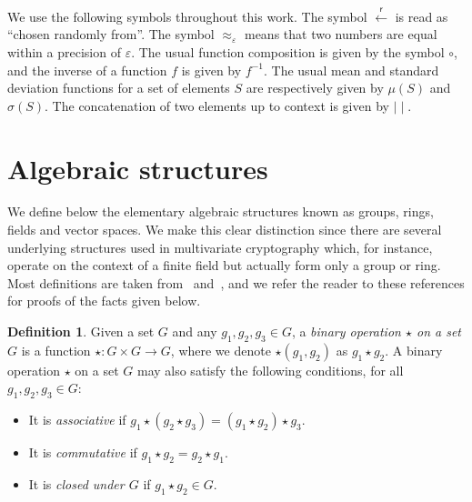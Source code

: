 \documentclass[12pt, a4paper, oneside]{memoir}
\newcommand{\random}{\overset{\mathsf{r}}{\gets}}
\theoremstyle{definition}
\newtheorem{definition}[theorem]{Definition}
\begin{document}
We use the following symbols throughout this work. The symbol $\random$ is read as ``chosen randomly from''. The symbol $\approx_{\varepsilon}$ means that two numbers are equal within a precision of $\varepsilon$. The usual function composition is given by the symbol $\circ$, and the inverse of a function $f$ is given by $f^{-1}$. The usual mean and standard deviation functions for a set of elements $S$ are respectively given by $\mu(S)$ and $\sigma(S)$. The concatenation of two elements up to context is given by $\mid\mid$.

\section{Algebraic structures}\label{sec:algebra}

We define below the elementary algebraic structures known as groups, rings, fields and vector spaces. We make this clear distinction since there are several underlying structures used in multivariate cryptography which, for instance, operate on the context of a finite field but actually form only a group or ring. Most definitions are taken from~\cite{Dummit:2003} and~\cite{Mullen:2013}, and we refer the reader to these references for proofs of the facts given below.

\begin{definition}
  Given a set $G$ and any $g_{1}, g_{2}, g_{3} \in G$, a \emph{binary operation $\star$ on a set $G$} is a function $\star : G \times G \to G$, where we denote $\star(g_{1}, g_{2})$ as $g_{1} \star g_{2}$. A binary operation $\star$ on a set $G$ may also satisfy the following conditions, for all $g_{1}, g_{2}, g_{3} \in G$:
  
  \begin{itemize}
    \item It is \emph{associative} if $g_{1} \star (g_{2} \star g_{3}) = (g_{1} \star g_{2}) \star g_{3}$.
    \item It is \emph{commutative} if $g_{1} \star g_{2} = g_{2} \star g_{1}$.
    \item It is \emph{closed under $G$} if $g_{1} \star g_{2} \in G$.
  \end{itemize}
\end{definition}
\end{document}
